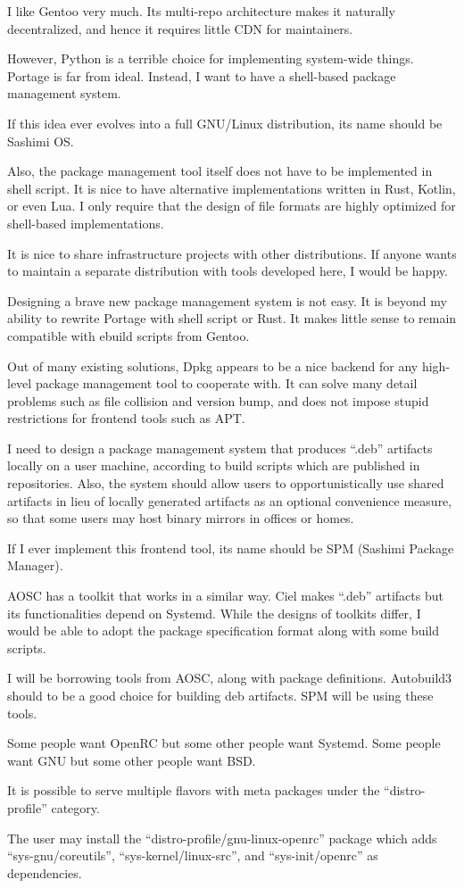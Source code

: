 
I like Gentoo very much.
Its multi-repo architecture makes it naturally decentralized,
and hence it requires little CDN for maintainers.

However, Python is a terrible choice for implementing system-wide things.
Portage is far from ideal.
Instead, I want to have a shell-based package management system.

If this idea ever evolves into a full GNU/Linux distribution, its name should be Sashimi OS.

Also, the package management tool itself does not have to be implemented in shell script.
It is nice to have alternative implementations written in Rust, Kotlin, or even Lua.
I only require that the design of file formats are highly optimized for shell-based implementations.

It is nice to share infrastructure projects with other distributions.
If anyone wants to maintain a separate distribution with tools developed here,
I would be happy.



Designing a brave new package management system is not easy.
It is beyond my ability to rewrite Portage with shell script or Rust.
It makes little sense to remain compatible with ebuild scripts from Gentoo.

Out of many existing solutions,
Dpkg appears to be a nice backend for any high-level package management tool to cooperate with.
It can solve many detail problems such as file collision and version bump,
and does not impose stupid restrictions for frontend tools such as APT.

I need to design a package management system that produces ``.deb'' artifacts locally on a user machine,
according to build scripts which are published in repositories.
Also, the system should allow users to opportunistically use shared artifacts in lieu of locally generated artifacts
as an optional convenience measure,
so that some users may host binary mirrors in offices or homes.

If I ever implement this frontend tool, its name should be SPM (Sashimi Package Manager).

AOSC has a toolkit that works in a similar way.
Ciel makes ``.deb'' artifacts but its functionalities depend on Systemd.
While the designs of toolkits differ, I would be able to adopt the package specification format along with some build scripts.

I will be borrowing tools from AOSC, along with package definitions.
Autobuild3 should to be a good choice for building deb artifacts.
SPM will be using these tools.



Some people want OpenRC but some other people want Systemd.
Some people want GNU but some other people want BSD.

It is possible to serve multiple flavors with meta packages under the ``distro-profile'' category.

The user may install the ``distro-profile/gnu-linux-openrc'' package
which adds ``sys-gnu/coreutils'', ``sys-kernel/linux-src'', and ``sys-init/openrc'' as dependencies.

